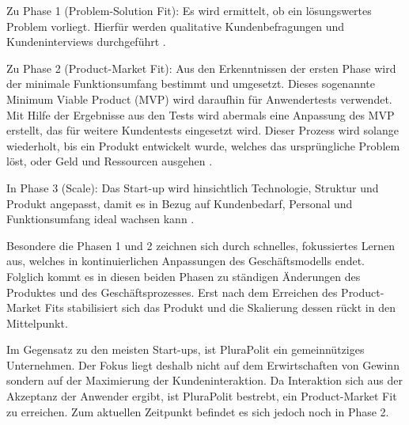 Zu Phase 1 (Problem-Solution Fit):
Es wird ermittelt, ob ein lösungswertes Problem vorliegt. Hierfür werden qualitative Kundenbefragungen und Kundeninterviews durchgeführt \parencite[vgl.][S. 170 ff.]{croll_lean_2013}.

Zu Phase 2 (Product-Market Fit):
 Aus den Erkenntnissen der ersten Phase wird der minimale Funktionsumfang bestimmt und umgesetzt. Dieses sogenannte Minimum Viable Product (MVP) wird daraufhin für Anwendertests verwendet. Mit Hilfe der Ergebnisse aus den Tests wird abermals eine Anpassung des MVP erstellt, das für weitere Kundentests eingesetzt wird. Dieser Prozess wird solange wiederholt, bis ein Produkt entwickelt wurde, welches das ursprüngliche Problem löst, oder Geld und Ressourcen ausgehen \parencite[vgl.][S. 28]{croll_lean_2013}.

In Phase 3 (Scale):
Das Start-up wird hinsichtlich Technologie, Struktur und Produkt angepasst, damit es in Bezug auf Kundenbedarf, Personal und Funktionsumfang ideal wachsen kann \parencite[vgl.][S. 9]{maurya_running_2012}.

Besondere die Phasen 1 und 2 zeichnen sich durch schnelles, fokussiertes Lernen aus, welches in kontinuierlichen Anpassungen des Geschäftsmodells endet. Folglich kommt es in diesen beiden Phasen zu ständigen Änderungen des Produktes und des Geschäftsprozesses. Erst nach dem Erreichen des Product-Market Fits stabilisiert sich das Produkt und die Skalierung dessen rückt in den Mittelpunkt.

Im Gegensatz zu den meisten Start-ups, ist PluraPolit ein gemeinnütziges Unternehmen. Der Fokus liegt deshalb nicht auf dem Erwirtschaften von Gewinn sondern auf der Maximierung der Kundeninteraktion. Da Interaktion sich aus der Akzeptanz der Anwender ergibt, ist PluraPolit bestrebt, ein Product-Market Fit zu erreichen. Zum aktuellen Zeitpunkt befindet es sich jedoch noch in Phase 2.
